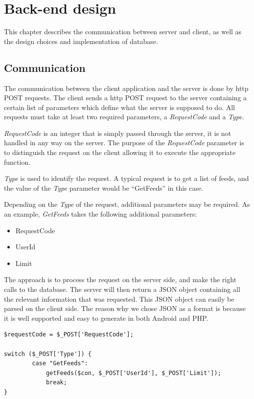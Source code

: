 \chapter{Back-end design}
This chapter describes the communication between server and client, as well as the design choices and implementation of database. %

\section{Communication}
\label{sec:com}

The communication between the client application and the server is done by \ac{http} POST requests.
The client sends a \ac{http} POST request to the server containing a certain list of parameters which define what the server is supposed to do. All requests must take at least two required parameters, a \textit{RequestCode} and a \textit{Type}.

\textit{RequestCode} is an integer that is simply passed through the server, it is not handled in any way on the server. The purpose of the \textit{RequestCode} parameter is to distinguish the request on the client allowing it to execute the appropriate function.

\textit{Type} is used to identify the request. A typical request is to get a list of feeds, and the value of the \textit{Type} parameter would be ``GetFeeds'' in this case.

Depending on the \textit{Type} of the request, additional parameters may be required. As an example, \textit{GetFeeds} takes the following additional parameters:
\begin{itemize}
\item RequestCode
\item UserId
\item Limit
\end{itemize}

The approach is to process the request on the server side, and make the right calls to the database. The server will then return a JSON object containing all the relevant information that was requested. This JSON object can easily be parsed on the client side. The reason why we chose JSON as a format is because it is well supported and easy to generate in both Android and PHP.

\begin{lstlisting}[language=phpstyle, caption=getFeeds function call]
$requestCode = $_POST['RequestCode'];

switch ($_POST['Type']) {
        case "GetFeeds":
            getFeeds($con, $_POST['UserId'], $_POST['Limit']);
            break;
}
\end{lstlisting}


